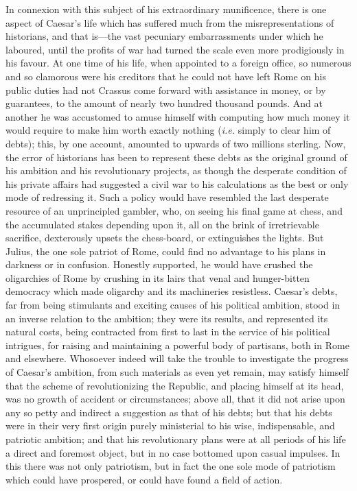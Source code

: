 In connexion with this subject of his extraordinary munificence, there
is one aspect of Caesar's life which has suffered much from the
misrepresentations of historians, and that is—the vast pecuniary
embarrassments under which he laboured, until the profits of war had
turned the scale even more prodigiously in his favour. At one time of
his life, when appointed to a foreign office, so numerous and so
clamorous were his creditors that he could not have left Rome on his
public duties had not Crassus come forward with assistance in money, or
by guarantees, to the amount of nearly two hundred thousand pounds. And
at another he was accustomed to amuse himself with computing how much
money it would require to make him worth exactly nothing (\emph{i.e.} simply
to clear him of debts); this, by one account, amounted to upwards of two
millions sterling. Now, the error of historians has been to represent
these debts as the original ground of his ambition and his revolutionary
projects, as though the desperate condition of his private affairs had
suggested a civil war to his calculations as the best or only mode of
redressing it. Such a policy would have resembled the last desperate
resource of an unprincipled gambler, who, on seeing his final game at
chess, and the accumulated stakes depending upon it, all on the brink of
irretrievable sacrifice, dexterously upsets the chess-board, or
extinguishes the lights. But Julius, the one sole patriot of Rome, could
find no advantage to his plans in darkness or in confusion. Honestly
supported, he would have crushed the oligarchies of Rome by crushing in
its lairs that venal and hunger-bitten democracy which made oligarchy
and its machineries resistless. Caesar's debts, far from being
stimulants and exciting causes of his political ambition, stood in an
inverse relation to the ambition; they were its results, and represented
its natural costs, being contracted from first to last in the service of
his political intrigues, for raising and maintaining a powerful body of
partisans, both in Rome and elsewhere. Whosoever indeed will take the
trouble to investigate the progress of Caesar's ambition, from such
materials as even yet remain, may satisfy himself that the scheme of
revolutionizing the Republic, and placing himself at its head, was no
growth of accident or circumstances; above all, that it did not arise
upon any so petty and indirect a suggestion as that of his debts; but
that his debts were in their very first origin purely ministerial to his
wise, indispensable, and patriotic ambition; and that his revolutionary
plans were at all periods of his life a direct and foremost object, but
in no case bottomed upon casual impulses. In this there was not only
patriotism, but in fact the one sole mode of patriotism which could have
prospered, or could have found a field of action.

